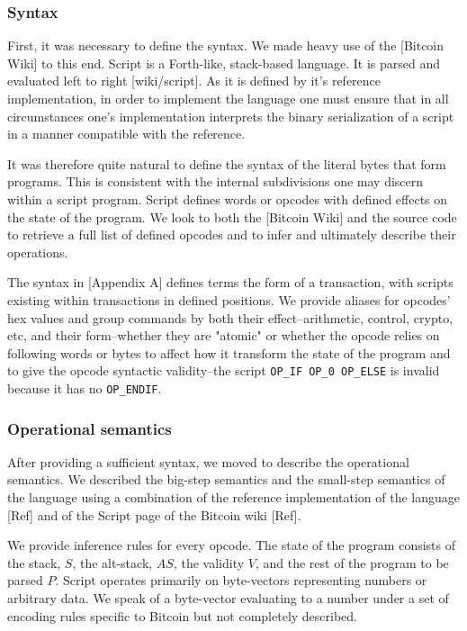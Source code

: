 \documentclass[letterpaper, 10 pt, conference]{ieeeconf}
\begin{document}
\subsubsection{Syntax}

First, it was necessary to define the syntax. We made heavy use of the [Bitcoin Wiki] to this end. Script is a Forth-like, stack-based language. It is parsed and evaluated left to right [wiki/script]. As it is defined by it's reference implementation, in order to implement the language one must ensure that in all circumstances one's implementation interprets the binary serialization of a script in a manner compatible with the reference.

It was therefore quite natural to define the syntax of the literal bytes that form programs. This is consistent with the internal subdivisions one may discern within a script program. Script defines words or opcodes with defined effects on the state of the program. We look to both the [Bitcoin Wiki] and the source code to retrieve a full list of defined opcodes and to infer and ultimately describe their operations.

The syntax in [Appendix A] defines terms the form of a transaction, with scripts existing within transactions in defined positions. We provide aliases for opcodes' hex values and group commands by both their effect--arithmetic, control, crypto, etc, and their form--whether they are "atomic" or whether the opcode relies on following words or bytes to affect how it transform the state of the program and to give the opcode syntactic validity--the script \texttt{OP\_IF OP\_0 OP\_ELSE} is invalid because it has no \texttt{OP\_ENDIF}.

\subsubsection{Operational semantics}

After providing a sufficient syntax, we moved to describe the operational semantics. We described the big-step semantics and the small-step semantics of the language using a combination of the reference implementation of the language [Ref] and of the Script page of the Bitcoin wiki [Ref].

We provide inference rules for every opcode. The state of the program consists of the stack, $S$, the alt-stack, $AS$, the validity $V$, and the rest of the program to be parsed $P$. Script operates primarily on byte-vectors representing numbers or arbitrary data. We speak of a byte-vector evaluating to a number under a set of encoding rules specific to Bitcoin but not completely described.
\end{document}
